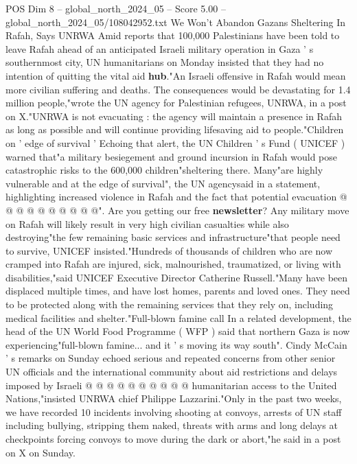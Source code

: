 \begin{textsample}{POS Dim 8 – global\_north\_2024\_05 – Score 5.00 – global\_north\_2024\_05/108042952.txt}  \label{ex:f8_pos_172}
We Won't Abandon Gazans Sheltering In Rafah, Says UNRWA Amid reports that 100,000 Palestinians have been told to leave Rafah ahead of an anticipated Israeli military operation in Gaza ' s southernmost city, UN humanitarians on Monday insisted that they had no intention of quitting the vital aid \textbf{hub}."An Israeli offensive in Rafah would mean more civilian suffering and deaths.
The consequences would be devastating for 1.4 million people,"wrote the UN agency for Palestinian refugees, UNRWA, in a post on X."UNRWA is not evacuating : the agency will maintain a presence in Rafah as long as possible and will continue providing lifesaving aid to people."Children on ' edge of survival ' Echoing that alert, the UN Children ' s Fund ( UNICEF ) warned that"a military besiegement and ground incursion in Rafah would pose catastrophic risks to the 600,000 children"sheltering there.
Many"are highly vulnerable and at the edge of survival", the UN agencysaid in a statement, highlighting increased violence in Rafah and the fact that potential evacuation @ @ @ @ @ @ @ @ @ @".
Are you getting our free \textbf{newsletter}?
Any military move on Rafah will likely result in very high civilian casualties while also destroying"the few remaining basic services and infrastructure"that people need to survive, UNICEF insisted."Hundreds of thousands of children who are now cramped into Rafah are injured, sick, malnourished, traumatized, or living with disabilities,"said UNICEF Executive Director Catherine Russell."Many have been displaced multiple times, and have lost homes, parents and loved ones.
They need to be protected along with the remaining services that they rely on, including medical facilities and shelter."Full-blown famine call In a related development, the head of the UN World Food Programme ( WFP ) said that northern Gaza is now experiencing"full-blown famine... and it ' s moving its way south".
Cindy McCain ' s remarks on Sunday echoed serious and repeated concerns from other senior UN officials and the international community about aid restrictions and delays imposed by Israeli @ @ @ @ @ @ @ @ @ @ humanitarian access to the United Nations,"insisted UNRWA chief Philippe Lazzarini."Only in the past two weeks, we have recorded 10 incidents involving shooting at convoys, arrests of UN staff including bullying, stripping them naked, threats with arms and long delays at checkpoints forcing convoys to move during the dark or abort,"he said in a post on X on Sunday.

\end{textsample}
